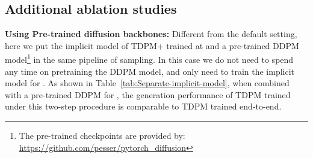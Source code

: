 \documentclass{article} \usepackage{iclr2023_conference,times}
\theoremstyle{plain}
\theoremstyle{definition}
\theoremstyle{remark}
\begin{document}
{\clearpage
\subsection{Additional ablation studies}

\textbf{Using Pre-trained diffusion backbones:} Different from the default setting, here we put the implicit model of TDPM+ trained at  and a pre-trained DDPM model\footnote{The pre-trained checkpoints are provided by: \url{https://github.com/pesser/pytorch\_diffusion}} in the same pipeline of sampling. In this case we do not need to spend any time on pretraining the DDPM model, 
and only need to train the implicit model for .
As shown in Table~\ref{tab:Separate-implicit-model}, when combined with a pre-trained DDPM for , the generation performance of TDPM trained under this two-step procedure is comparable to TDPM trained end-to-end. 
\begin{table}[ht]
\caption{{Results of adding a separately trained implicit generator to a pre-trained diffusion model on CIFAR-10.}}
\label{tab:Separate-implicit-model}
\centering
\renewcommand{\arraystretch}{1.}
    \vspace{-3mm}
\end{table}



}
\end{document}
